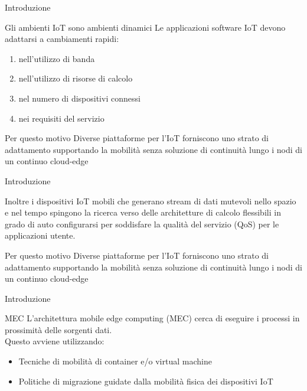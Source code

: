 \documentclass{beamer}
\begin{document}
	\begin{frame}{Introduzione}
	\begin{block}{Gli ambienti IoT sono ambienti dinamici}
		Le applicazioni software IoT devono adattarsi a cambiamenti rapidi: 
			\begin{enumerate}
			\item nell'utilizzo di banda
			\item nell'utilizzo di risorse di calcolo
			\item nel numero di dispositivi connessi
			\item nei requisiti del servizio
		\end{enumerate}
	\end{block}
	\begin{block}{Per questo motivo}
	Diverse piattaforme per l’IoT forniscono uno strato di adattamento supportando la mobilità senza
	soluzione di continuità lungo i nodi di un continuo cloud-edge
	\end{block}
	\end{frame}


	\begin{frame}{Introduzione}
	\begin{block}{Inoltre}
		i dispositivi IoT mobili che generano stream di dati mutevoli nello spazio e nel
		tempo spingono la ricerca verso delle architetture di calcolo flessibili in grado di auto configurarsi per
		soddisfare la qualità del servizio (QoS) per le applicazioni utente.
	\end{block}
	\begin{block}{Per questo motivo}
		Diverse piattaforme per l’IoT forniscono uno strato di adattamento supportando la mobilità senza
		soluzione di continuità lungo i nodi di un continuo cloud-edge
	\end{block}
	\end{frame}


	\begin{frame}{Introduzione}
	\begin{block}{MEC}
		L'architettura mobile edge computing (MEC) cerca di eseguire i processi in prossimità delle sorgenti dati.\\
		Questo avviene utilizzando:
		\begin{itemize}
			\item Tecniche di mobilità di container e/o virtual machine
			\item Politiche di migrazione guidate dalla mobilità fisica dei dispositivi IoT
		\end{itemize}
	\end{block}
	\end{frame}
\end{document}

